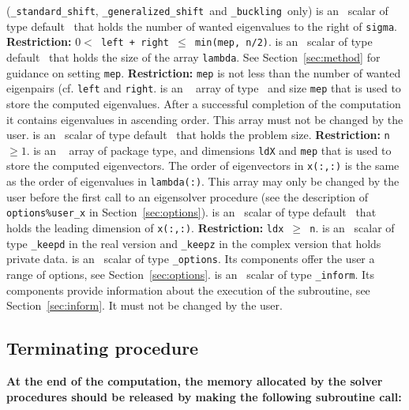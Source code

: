 \begin{description}
%
({\tt \solver\_standard\_shift}, {\tt \solver\_generalized\_shift}\
and {\tt \solver\_buckling}\ only)
is an \intentin\ scalar of type default \Integer\ 
that holds the number of wanted eigenvalues to the right of {\tt sigma}.
{\bf Restriction:} {\tt $0 < $ left + right $\le$ min(mep, n/2)}.
%
\itt{mep} is an \intentin\ scalar of type default \Integer\ 
that holds the size of the array {\tt lambda}.
See Section~\ref{sec:method} for guidance on
setting {\tt mep}.
{\bf Restriction:} 
{\tt mep} is not less than the number of wanted eigenpairs
(cf. {\tt left} and {\tt right}.
%
\itt{lambda(:)} is an \intentinout\ %
array of type \REALDP\
and size {\tt mep} that is
used to store the computed eigenvalues.
After a successful completion of the computation
it contains eigenvalues in ascending order.
This array must not be changed by the user.
%
\itt{n} is an \intentin\ scalar of type default \Integer\ 
that holds the problem size.
{\bf Restriction:} {\tt n $\ge 1$}.
%
 is an \intentinout\ %
array of package type,
and dimensions {\tt ldX} and {\tt mep} that is
used to store the computed eigenvectors.
The order of eigenvectors in {\tt x(:,:)}
is the same as the order of eigenvalues in {\tt lambda(:)}.
This array may only be changed by the user
before the first call to an eigensolver procedure
(see the description of {\tt options\%user\_x} in Section~\ref{sec:options}).
%
\itt{ldx} is an \intentin\ scalar of type default \Integer\ 
that holds the leading dimension of {\tt x(:,:)}.
{\bf Restriction:} {\tt ldx $\ge$ n}.
%
\itt{keep} is an \intentinout\ scalar of type 
{\tt \solver\_keepd} in the real version and
{\tt \solver\_keepz} in the complex version
that holds private data. 
%
 is an \intentin\  scalar  of type {\tt \solver\_options}.
Its components offer the user a range of options,
see Section~\ref{sec:options}.
%
\itt{inform} is an \intentinout\ scalar of type 
{\tt \solver\_inform}. Its components provide information about the execution
of the subroutine, see Section~\ref{sec:inform}.
It must not be changed by the user.
%
\end{description}

\subsection{Terminating procedure}

{\bf
At the end of the computation, the memory 
allocated by the solver procedures
should be released
by making the following subroutine call:
}

